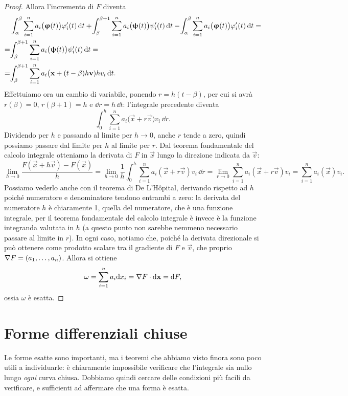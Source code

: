 \begin{proof}
	Allora l'incremento di $F$ diventa
	\begin{equation}
		\begin{aligned}
			&\int_\alpha^\beta\sum_{i=1}^na_i\big(\bm{\upvarphi}(t)\big)\varphi_i'(t)\,\textup{d} t+\!\int_\beta^{\beta+1}\sum_{i=1}^na_i\big(\bm{\uppsi}(t)\big)\psi_i'(t)\,\textup{d} t-\!\int_\alpha^\beta\sum_{i=1}^na_i\big(\bm{\upvarphi}(t)\big)\varphi_i'(t)\,\textup{d} t=\\
			=&\!\int_\beta^{\beta+1}\sum_{i=1}^na_i\big(\bm{\uppsi}(t)\big)\psi_i'(t)\,\textup{d} t=\\
			=&\!\int_\beta^{\beta+1}\sum_{i=1}^na_i\big(\mathbf{x}+(t-\beta)h\mathbf{v})hv_i\,\textup{d} t.
		\end{aligned}
	\end{equation}
	Effettuiamo ora un cambio di variabile, ponendo $r=h(t-\beta)$, per cui si avrà $r(\beta)=0$, $r(\beta+1)=h$ e $\dd r=h\,\dd t$: l'integrale precedente diventa
	\begin{equation}
		\int_0^h\sum_{i=1}^na_i\big(\vec x+r\vec v)v_i\,\dd r.
	\end{equation}
	Dividendo per $h$ e passando al limite per $h\to0$, anche $r$ tende a zero, quindi possiamo passare dal limite per $h$ al limite per $r$.
	Dal teorema fondamentale del calcolo integrale otteniamo la derivata di $F$ in $\vec x$ lungo la direzione indicata da $\vec v$:
	\begin{equation}
		\lim_{h\to0}\frac{F(\vec x+h\vec v)-F(\vec x)}{h}=\lim_{h\to0}\frac1{h}\int_0^h\sum_{i=1}^na_i(\vec x+r\vec v)v_i\,\dd r=\lim_{r\to 0}\sum_{i=1}^na_i(\vec x+r\vec v)v_i=\sum_{i=1}^na_i(\vec x)v_i.
	\end{equation}
	Possiamo vederlo anche con il teorema di De L'H\^opital, derivando rispetto ad $h$ poich\'e numeratore e denominatore tendono entrambi a zero: la derivata del numeratore $h$ è chiaramente 1, quella del numeratore, che è una funzione integrale, per il teorema fondamentale del calcolo integrale è invece è la funzione integranda valutata in $h$ (a questo punto non sarebbe nemmeno necessario passare al limite in $r$).
	In ogni caso, notiamo che, poiché la derivata direzionale si può ottenere come prodotto scalare tra il gradiente di $F$ e $\vec v$, che proprio $\nabla F=(a_1,\dots,a_n)$.
	Allora si ottiene
	\begin{equation}
		\omega=\sum_{i=1}^na_i\textup{d} x_i={\nabla F}\cdot{\textup{d}\mathbf{x}}=\textup{d} F,
	\end{equation}
	ossia $\omega$ è esatta.
\end{proof}

\section{Forme differenziali chiuse}
Le forme esatte sono importanti, ma i teoremi che abbiamo visto finora sono poco utili a individuarle: è chiaramente impossibile verificare che l'integrale sia nullo lungo \emph{ogni} curva chiusa.
Dobbiamo quindi cercare delle condizioni più facili da verificare, e sufficienti ad affermare che una forma è esatta.

